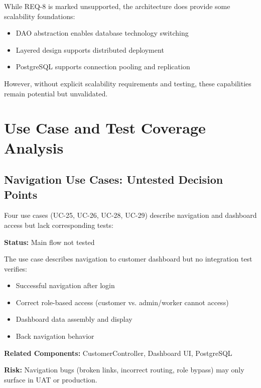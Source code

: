 \documentclass[11pt,a4paper]{article}
\begin{document}
While REQ-8 is marked unsupported, the architecture does provide some scalability foundations:
\begin{itemize}
    \item DAO abstraction enables database technology switching
    \item Layered design supports distributed deployment
    \item PostgreSQL supports connection pooling and replication
\end{itemize}

However, without explicit scalability requirements and testing, these capabilities remain potential but unvalidated.

\section{Use Case and Test Coverage Analysis}

\subsection{Navigation Use Cases: Untested Decision Points}

Four use cases (UC-25, UC-26, UC-28, UC-29) describe navigation and dashboard access but lack corresponding tests:

\begin{tcolorbox}[colback=warningorange!5,colframe=warningorange,title=\textbf{UC-25: Access Customer Dashboard}]
\textbf{Status:} Main flow not tested

The use case describes navigation to customer dashboard but no integration test verifies:
\begin{itemize}
    \item Successful navigation after login
    \item Correct role-based access (customer vs. admin/worker cannot access)
    \item Dashboard data assembly and display
    \item Back navigation behavior
\end{itemize}

\textbf{Related Components:} CustomerController, Dashboard UI, PostgreSQL

\textbf{Risk:} Navigation bugs (broken links, incorrect routing, role bypass) may only surface in UAT or production.
\end{tcolorbox}
\end{document}

